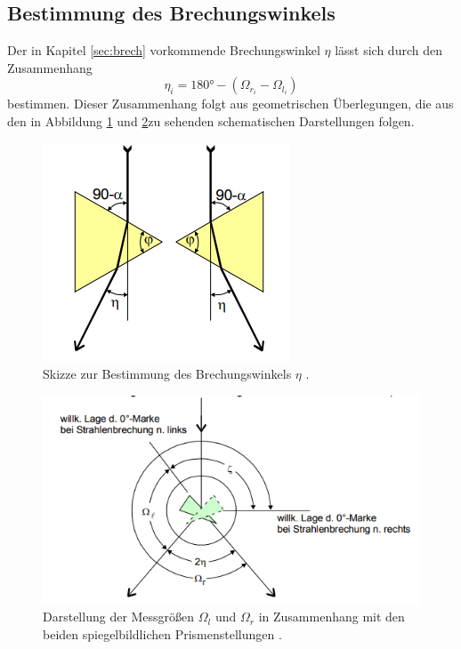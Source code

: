 \subsection{Bestimmung des Brechungswinkels} \label{sec:MessEta}
Der in Kapitel \ref{sec:brech} vorkommende Brechungswinkel $\eta$ lässt sich durch den Zusammenhang
\begin{equation}
  \eta_i = 180\si{\degree}-(\Omega_\text{$r_i$}-\Omega_\text{$l_i$}) \label{eq:eta}
\end{equation} bestimmen.
Dieser Zusammenhang folgt aus geometrischen Überlegungen, die aus den in Abbildung \ref{fig:eta1} und \ref{fig:eta2}zu sehenden schematischen Darstellungen folgen.
\newline
\begin{figure}[H]
  \centering
  \includegraphics[scale=0.85]{Text/Bilder/MessEta.png}
  \caption{Skizze zur Bestimmung des Brechungswinkels $\eta$ \cite[26]{sample}.}
  \label{fig:eta1}
\end{figure}

\begin{figure}[H]
  \centering
  \includegraphics[scale=0.85]{Text/Bilder/MessEta2.png}
  \caption{Darstellung der Messgrößen $\Omega_l$ und $\Omega_r$ in Zusammenhang mit den beiden spiegelbildlichen Prismenstellungen \cite[26]{sample}.}
  \label{fig:eta2}
\end{figure}
